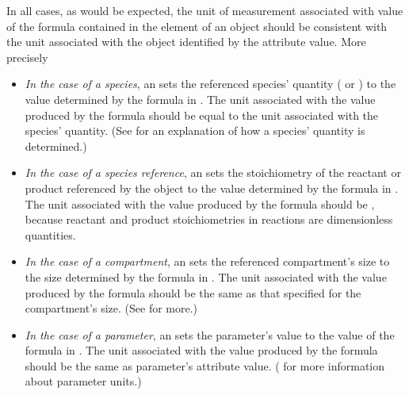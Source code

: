 In all cases, as would be expected, the unit of measurement
associated with value of the formula contained in the 
element of an \EventAssignment object should be consistent with
the unit associated with the object identified by the
 attribute value.  More precisely
\begin{itemize}
  
\item \emph{In the case of a species}, an \EventAssignment sets
  the referenced species' quantity ( or
  ) to the value determined by the formula in
  .  The unit associated with the value produced by
  the  formula should be equal to the unit associated
  with the species' quantity.  (See
   for an explanation of how a
  species' quantity is determined.)

\item \emph{In the case of a species reference}, an
  \EventAssignment sets the stoichiometry of the reactant or
  product referenced by the \SpeciesReference object to the value
  determined by the formula in .  The unit associated
  with the value produced by the  formula should be
  , because reactant and product
  stoichiometries in reactions are dimensionless quantities.

\item \emph{In the case of a compartment}, an \EventAssignment
  sets the referenced compartment's size to the size determined by
  the formula in .  The unit associated with the value
  produced by the  formula should be the same as that
  specified for the compartment's size.  (See
   for more.)

\item \emph{In the case of a parameter}, an \EventAssignment sets
  the parameter's value to the value of the formula in
  .  The unit associated with the value produced by
  the  formula should be the same as parameter's
   attribute value.
  ( for more information about
  parameter units.)


\end{itemize}

